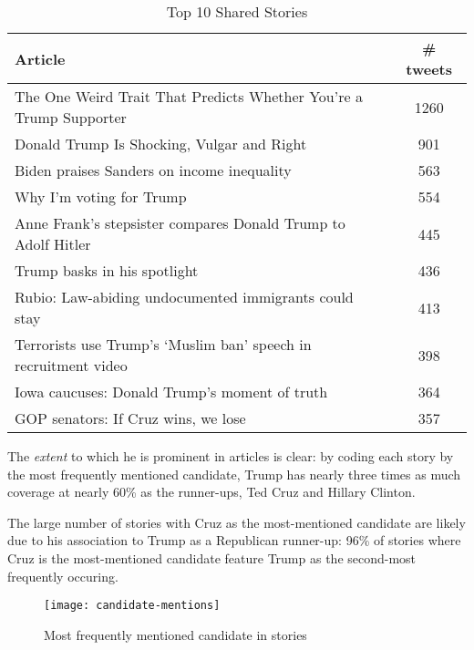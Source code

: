  
\begin{table}
\begin{tabular}{ |l c| } 
    \hline
    Article &  \# tweets \\
    \hline
    The One Weird Trait That Predicts Whether You're a Trump Supporter &   1260 \\
    Donald Trump Is Shocking, Vulgar and Right                         &    901 \\
    Biden praises Sanders on income inequality                         &    563 \\
    Why I'm voting for Trump                                           &    554 \\
    Anne Frank's stepsister compares Donald Trump to Adolf Hitler      &    445 \\
    Trump basks in his spotlight                                       &    436 \\
    Rubio: Law-abiding undocumented immigrants could stay              &    413 \\
    Terrorists use Trump's `Muslim ban' speech in recruitment video    &    398 \\
    Iowa caucuses: Donald Trump's moment of truth                      &    364 \\
    GOP senators: If Cruz wins, we lose                                &    357 \\
    \hline
\end{tabular}
\caption{\label{tab:top-10}Top 10 Shared Stories}
\end{table}

The \emph{extent} to which he is prominent in articles is clear: by coding each story by the most frequently mentioned candidate, Trump has nearly three times as much coverage at nearly 60\% as the runner-ups, Ted Cruz and Hillary Clinton.

The large number of stories with Cruz as the most-mentioned candidate are likely due to his association to Trump as a Republican runner-up: 96\% of stories where Cruz is the most-mentioned candidate feature Trump as the second-most frequently occuring.

\begin{figure}[H]  
\centering 
  \texttt{[image: candidate-mentions]}  
  \caption{Most frequently mentioned candidate in stories
    \label{fig:tweets-by-pub}}
\end{figure} 

